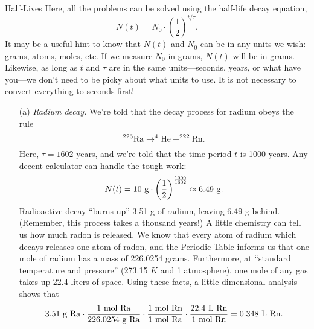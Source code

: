 \documentclass[12pt]{article}
\begin{document}
\begin{probdesc}{6}{Half-Lives}
Here, all the problems can be solved using the half-life decay equation,
\begin{equation}
N(t) = N_0 \cdot \left(\frac{1}{2}\right)^{t / \tau}.
\end{equation}
It may be a useful hint to know that $N(t)$ and $N_0$ can be in any
units we wish:  grams, atoms, moles, etc.  If we measure $N_0$ in
grams, $N(t)$ will be in grams.  Likewise, as long as $t$ and $\tau$
are in the same units---seconds, years, or what have you---we don't
need to be picky about what units to use.  It is not necessary to
convert everything to seconds first!

\begin{enumerate}
\item[(a)] {\em Radium decay.}  We're told that the decay process for
  radium obeys the rule
  \begin{equation}
    ^{226}{\rm Ra} \rightarrow ^4{\rm He} + ^{222}{\rm Rn}.
  \end{equation}
  Here, $\tau = 1602$ years, and we're told that the time period $t$
  is 1000 years.  Any decent calculator can handle the tough work:
\begin{equation}
N(t) = 10 {\rm\ g} \cdot \left(\frac{1}{2}\right)^{\frac{1000}{1602}}
  \approx 6.49 {\rm\ g}.
\end{equation}
Radioactive decay ``burns up'' 3.51 g of radium, leaving 6.49 g
behind.  (Remember, this process takes a thousand years!)  A little
chemistry can tell us how much radon is released.  We know that every
atom of radium which decays releases one atom of radon, and the
Periodic Table informs us that one mole of radium has a mass of
226.0254 grams.  Furthermore, at ``standard temperature and pressure''
(273.15 $K$ and 1 atmosphere), one mole of any gas takes up 22.4
liters of space.  Using these facts, a little dimensional analysis
shows that
\begin{equation}
3.51 {\rm\ g\ Ra} \cdot
\frac{1 \rm\ mol\ Ra}{226.0254 \rm\ g\ Ra} \cdot
\frac{1 \rm\ mol\ Rn}{1 \rm\ mol\ Ra} \cdot
\frac{22.4 \rm\ L\ Rn}{1 \rm\ mol\ Rn} = 0.348 \rm\ L\ Rn.
\end{equation}



\end{enumerate}
\end{probdesc}
\end{document}
